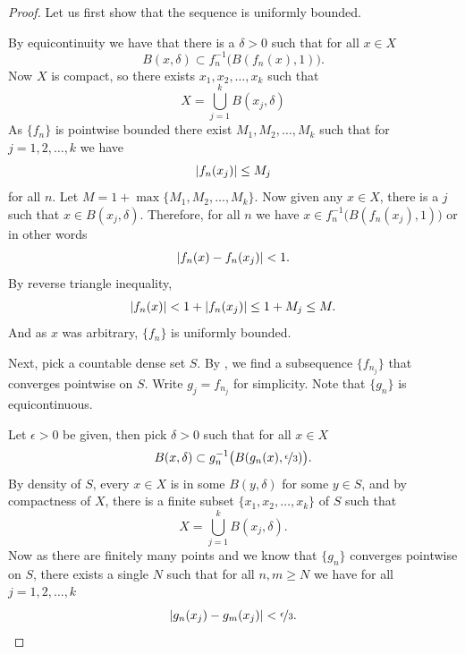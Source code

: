 \begin{proof}
Let us first show that the sequence is uniformly bounded.

By equicontinuity we have that there is a $\delta > 0$
such that for all $x \in X$
\begin{equation*}
B(x,\delta) \subset f_n^{-1}\bigl(B(f_n(x),1)\bigr) .
\end{equation*}
Now $X$ is compact, so there exists $x_1,x_2,\ldots,x_k$
such that
\begin{equation*}
X = \bigcup_{j=1}^k B(x_j,\delta)
\end{equation*}
As $\{ f_n \}$ is pointwise bounded there exist $M_1,M_2,\ldots,M_k$
such that for $j=1,2,\ldots,k$ we have
\begin{equation*}
\lvert {f_n(x_j)} \rvert \leq M_j
\end{equation*}
for all $n$.  Let $M = 1+ \max \{ M_1,M_2,\ldots,M_k \}$.  Now given any
$x \in X$, there is a $j$ such that $x \in B(x_j,\delta)$.  Therefore,
for all $n$ we have
$x \in f_n^{-1}\bigl(B(f_n(x_j),1)\bigr)$ or in other words
\begin{equation*}
\lvert {f_n(x)-f_n(x_j)} \rvert < 1 .
\end{equation*}
By reverse triangle inequality,
\begin{equation*}
\lvert {f_n(x)} \rvert < 1+ \lvert {f_n(x_j)} \rvert \leq 1+M_j \leq M .
\end{equation*}
And as $x$ was arbitrary, $\{f_n\}$ is uniformly bounded.


Next, pick a countable dense set $S$.  By , we find
a subsequence $\{ f_{n_j} \}$ that converges pointwise on $S$.
Write $g_j = f_{n_j}$ for simplicity.  Note that $\{ g_n \}$ is 
equicontinuous.

Let $\epsilon > 0$ be given, then pick $\delta > 0$
such that for all $x \in X$
\begin{equation*}
B(x,\delta) \subset g_n^{-1}\bigl(B(g_n(x),\nicefrac{\epsilon}{3})\bigr).
\end{equation*}
By density of $S$, every $x \in X$ is in some $B(y,\delta)$
for some $y \in S$, and by compactness of $X$,
there is a finite subset $\{ x_1,x_2,\ldots,x_k \}$ of $S$
such that
\begin{equation*}
X = \bigcup_{j=1}^k B(x_j,\delta) .
\end{equation*}
Now as there are finitely many points and we know that $\{ g_n \}$
converges pointwise on $S$, there exists a single $N$ such that for 
all $n,m \geq N$ we have for all $j=1,2,\ldots,k$
\begin{equation*}
\lvert {g_n(x_j)-g_m(x_j)} \rvert < \nicefrac{\epsilon}{3} .
\end{equation*}


\end{proof}

